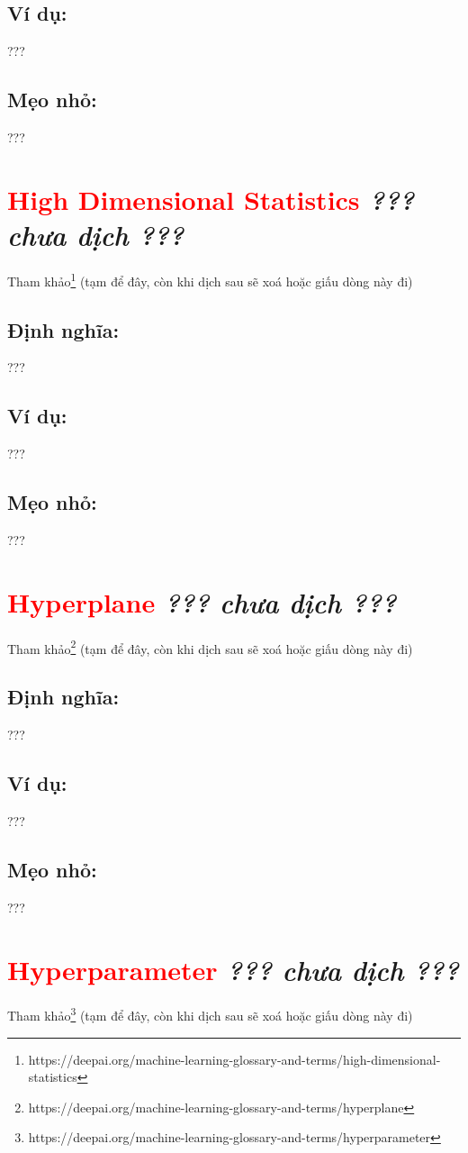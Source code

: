\subsection*{Ví dụ:}
???
\subsection*{Mẹo nhỏ:}
???
\section*{\huge \textcolor{Red}{High Dimensional Statistics}  \small \textit{??? chưa dịch ???} }
Tham khảo\footnote{https://deepai.org/machine-learning-glossary-and-terms/high-dimensional-statistics} (tạm để đây, còn khi dịch sau sẽ xoá hoặc giấu dòng này đi)
\subsection*{Định nghĩa:}
???
\subsection*{Ví dụ:}
???
\subsection*{Mẹo nhỏ:}
???
\section*{\huge \textcolor{Red}{Hyperplane}  \small \textit{??? chưa dịch ???} }
Tham khảo\footnote{https://deepai.org/machine-learning-glossary-and-terms/hyperplane} (tạm để đây, còn khi dịch sau sẽ xoá hoặc giấu dòng này đi)
\subsection*{Định nghĩa:}
???
\subsection*{Ví dụ:}
???
\subsection*{Mẹo nhỏ:}
???
\section*{\huge \textcolor{Red}{Hyperparameter}  \small \textit{??? chưa dịch ???} }
Tham khảo\footnote{https://deepai.org/machine-learning-glossary-and-terms/hyperparameter} (tạm để đây, còn khi dịch sau sẽ xoá hoặc giấu dòng này đi)

